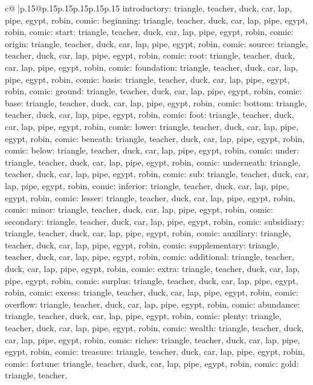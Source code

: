 \documentclass{article}
\begin{document}
{\begin{supertabular}{c@{$\;$}|p{.15\linewidth}@{}p{.15\linewidth}p{.15\linewidth}p{.15\linewidth}p{.15\linewidth}p{.15\linewidth}}
{{{introductory\nTARGETS: triangle, teacher, duck, car, lap, pipe, egypt, robin, comic\n\nCLUE: beginning\nTARGETS: triangle, teacher, duck, car, lap, pipe, egypt, robin, comic\n\nCLUE: start\nTARGETS: triangle, teacher, duck, car, lap, pipe, egypt, robin, comic\n\nCLUE: origin\nTARGETS: triangle, teacher, duck, car, lap, pipe, egypt, robin, comic\n\nCLUE: source\nTARGETS: triangle, teacher, duck, car, lap, pipe, egypt, robin, comic\n\nCLUE: root\nTARGETS: triangle, teacher, duck, car, lap, pipe, egypt, robin, comic\n\nCLUE: foundation\nTARGETS: triangle, teacher, duck, car, lap, pipe, egypt, robin, comic\n\nCLUE: basis\nTARGETS: triangle, teacher, duck, car, lap, pipe, egypt, robin, comic\n\nCLUE: ground\nTARGETS: triangle, teacher, duck, car, lap, pipe, egypt, robin, comic\n\nCLUE: base\nTARGETS: triangle, teacher, duck, car, lap, pipe, egypt, robin, comic\n\nCLUE: bottom\nTARGETS: triangle, teacher, duck, car, lap, pipe, egypt, robin, comic\n\nCLUE: foot\nTARGETS: triangle, teacher, duck, car, lap, pipe, egypt, robin, comic\n\nCLUE: lower\nTARGETS: triangle, teacher, duck, car, lap, pipe, egypt, robin, comic\n\nCLUE: beneath\nTARGETS: triangle, teacher, duck, car, lap, pipe, egypt, robin, comic\n\nCLUE: below\nTARGETS: triangle, teacher, duck, car, lap, pipe, egypt, robin, comic\n\nCLUE: under\nTARGETS: triangle, teacher, duck, car, lap, pipe, egypt, robin, comic\n\nCLUE: underneath\nTARGETS: triangle, teacher, duck, car, lap, pipe, egypt, robin, comic\n\nCLUE: sub\nTARGETS: triangle, teacher, duck, car, lap, pipe, egypt, robin, comic\n\nCLUE: inferior\nTARGETS: triangle, teacher, duck, car, lap, pipe, egypt, robin, comic\n\nCLUE: lesser\nTARGETS: triangle, teacher, duck, car, lap, pipe, egypt, robin, comic\n\nCLUE: minor\nTARGETS: triangle, teacher, duck, car, lap, pipe, egypt, robin, comic\n\nCLUE: secondary\nTARGETS: triangle, teacher, duck, car, lap, pipe, egypt, robin, comic\n\nCLUE: subsidiary\nTARGETS: triangle, teacher, duck, car, lap, pipe, egypt, robin, comic\n\nCLUE: auxiliary\nTARGETS: triangle, teacher, duck, car, lap, pipe, egypt, robin, comic\n\nCLUE: supplementary\nTARGETS: triangle, teacher, duck, car, lap, pipe, egypt, robin, comic\n\nCLUE: additional\nTARGETS: triangle, teacher, duck, car, lap, pipe, egypt, robin, comic\n\nCLUE: extra\nTARGETS: triangle, teacher, duck, car, lap, pipe, egypt, robin, comic\n\nCLUE: surplus\nTARGETS: triangle, teacher, duck, car, lap, pipe, egypt, robin, comic\n\nCLUE: excess\nTARGETS: triangle, teacher, duck, car, lap, pipe, egypt, robin, comic\n\nCLUE: overflow\nTARGETS: triangle, teacher, duck, car, lap, pipe, egypt, robin, comic\n\nCLUE: abundance\nTARGETS: triangle, teacher, duck, car, lap, pipe, egypt, robin, comic\n\nCLUE: plenty\nTARGETS: triangle, teacher, duck, car, lap, pipe, egypt, robin, comic\n\nCLUE: wealth\nTARGETS: triangle, teacher, duck, car, lap, pipe, egypt, robin, comic\n\nCLUE: riches\nTARGETS: triangle, teacher, duck, car, lap, pipe, egypt, robin, comic\n\nCLUE: treasure\nTARGETS: triangle, teacher, duck, car, lap, pipe, egypt, robin, comic\n\nCLUE: fortune\nTARGETS: triangle, teacher, duck, car, lap, pipe, egypt, robin, comic\n\nCLUE: gold\nTARGETS: triangle, teacher, }}}
\end{supertabular}}
\end{document}
